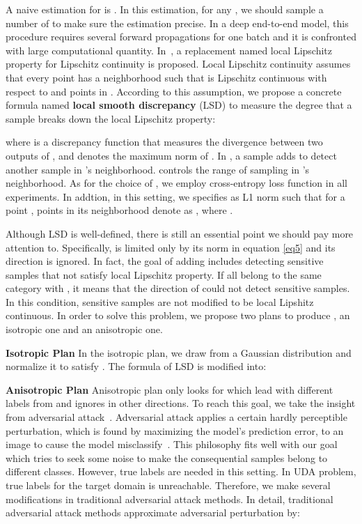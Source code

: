 \documentclass[10pt,twocolumn,letterpaper]{article}
\begin{document}
A naive estimation for  is . In this estimation, for any , we should sample a number of  to make sure the estimation precise. In a deep end-to-end model, this procedure requires several forward propagations for one batch and it is confronted with large computational quantity. In~\cite{grandvalet2004semi-supervised}, a replacement named local Lipschitz property for Lipschitz continuity is proposed. Local Lipschitz continuity assumes that every point  has a neighborhood  such that  is Lipschitz continuous with respect to  and points in . According to this assumption, we propose a concrete formula named {\bf local smooth discrepancy} (LSD) to measure the degree that a sample  breaks down the local Lipschitz property:

where  is a discrepancy function that measures the divergence between two outputs of , and  denotes the maximum norm of . In , a sample  adds  to detect another sample in 's neighborhood.  controls the range of sampling in 's neighborhood. As for the choice of , we employ cross-entropy loss function in all experiments. In addtion, in this setting, we specifies  as L1 norm such that for a point , points in its neighborhood denote as , where .

Although LSD is well-defined, there is still an essential point we should pay more attention to. Specifically,  is limited only by its norm in equation \ref{eq5} and its direction is ignored. In fact, the goal of adding  includes detecting sensitive samples that not satisfy local Lipschitz property. If all  belong to the same category with , it means that the direction of  could not detect sensitive samples. In this condition, sensitive samples are not modified to be local Lipshitz continuous. In order to solve this problem, we propose two plans to produce , an isotropic one and an anisotropic one.

{\bf Isotropic Plan} In the isotropic plan, we draw  from a Gaussian distribution and normalize it to satisfy . The formula of LSD is modified into:


{\bf Anisotropic Plan} Anisotropic plan only looks for  which lead  with different labels from  and ignores  in other directions. To reach this goal, we take the insight from adversarial attack~\cite{goodfellow2014explaining}. Adversarial attack applies a certain hardly perceptible perturbation, which is found by maximizing the model's prediction error, to an image to cause the model misclassify~\cite{goodfellow2014explaining}. This philosophy fits well with our goal which tries to seek some noise to make the consequential samples belong to different classes. However, true labels are needed in this setting. In UDA problem, true labels for the target domain is unreachable. Therefore, we make several modifications in traditional adversarial attack methods. In detail, traditional adversarial attack methods approximate adversarial perturbation by:
\end{document}
